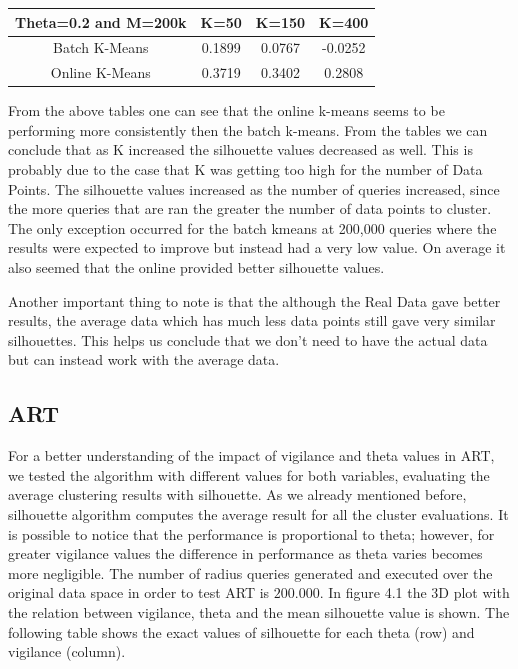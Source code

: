 \documentclass{lmproj}
\begin{document}
\begin{center}
 \label{table4}
\begin{tabular}{|c|c|c|c|}
	\hline Theta=0.2 and M=200k & K=50 & K=150 & K=400 \\ 
	\hline Batch K-Means & 0.1899 & 0.0767  & -0.0252  \\ 
	\hline Online K-Means & 0.3719 & 0.3402 & 0.2808 \\ 
	\hline 
\end{tabular}
\end{center}

From the above tables one can see that the online k-means seems to be performing more consistently then the batch k-means. From the tables we can conclude that as K increased the silhouette values decreased as well. This is probably due to the case that K was getting too high for the number of Data Points. The silhouette values increased as the number of queries increased, since the more queries that are ran the greater the number of data points to cluster. The only exception occurred for the batch kmeans at 200,000 queries where the results were expected to improve but instead had a very low value. On average it also seemed that the online provided better silhouette values.

Another important thing to note is that the although the Real Data gave better results, the average data which has much less data points still gave very similar silhouettes. This helps us conclude that we don't need to have the actual data but can instead work with the average data.

\subsection{ART}
For a better understanding of the impact of vigilance and theta values in ART, we tested the algorithm with different values for both variables, evaluating the average clustering results with silhouette. As we already mentioned before, silhouette algorithm computes the average result for all the cluster evaluations. It is possible to notice that the performance is proportional to theta; however, for greater vigilance values the difference in performance as theta varies becomes more negligible.
The number of radius queries generated and executed over the original data space in order to test ART is $200.000$. In figure 4.1 the 3D plot with the relation between vigilance, theta and the mean silhouette value is shown. The following table shows the exact values of silhouette for each theta (row) and vigilance (column).
\end{document}
